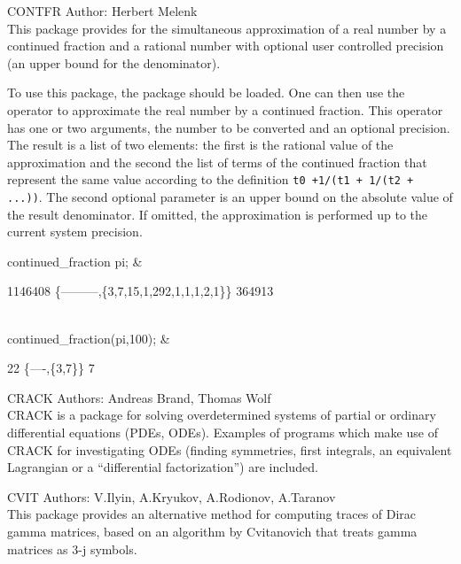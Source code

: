 \begin{Package}{CONTFR}
Author: Herbert Melenk\\

This package provides for the simultaneous approximation of a real number
by a continued fraction and a rational number with optional user
controlled precision (an upper bound for the denominator).

To use this package, the  package should be loaded.  One can then
use the operator  to approximate the real
number by a continued fraction.  This operator has one or two arguments, the
number to be converted and an optional precision.  The result is a list of
two elements: the first is the rational value of the approximation and the
second the list of terms of the continued fraction that represent the same
value according to the definition \verb&t0 +1/(t1 + 1/(t2 + ...))&.  The
second optional parameter  is an upper bound on the absolute
value of the result denominator.  If omitted, the approximation is performed
up to the current system precision.

\begin{Examples}
continued\_fraction pi;   &
\begin{multilineoutput}{6cm}
  1146408
\{---------,\{3,7,15,1,292,1,1,1,2,1\}\}
  364913
\end{multilineoutput} \\

continued\_fraction(pi,100);  &
\begin{multilineoutput}{6cm}
  22
\{----,\{3,7\}\}
  7
\end{multilineoutput}
\end{Examples}
\end{Package}

\begin{Package}{CRACK}
Authors: Andreas Brand, Thomas Wolf\\

CRACK is a package for solving overdetermined systems of partial or
ordinary differential equations (PDEs, ODEs).  Examples of programs which
make use of CRACK for investigating ODEs (finding symmetries, first
integrals, an equivalent Lagrangian or a ``differential factorization'') are
included.
\end{Package}

\begin{Package}{CVIT}
Authors: V.Ilyin, A.Kryukov, A.Rodionov, A.Taranov\\

This package provides an alternative method for computing traces of Dirac
gamma matrices, based on an algorithm by Cvitanovich that treats gamma
matrices as 3-j symbols.
\end{Package}

